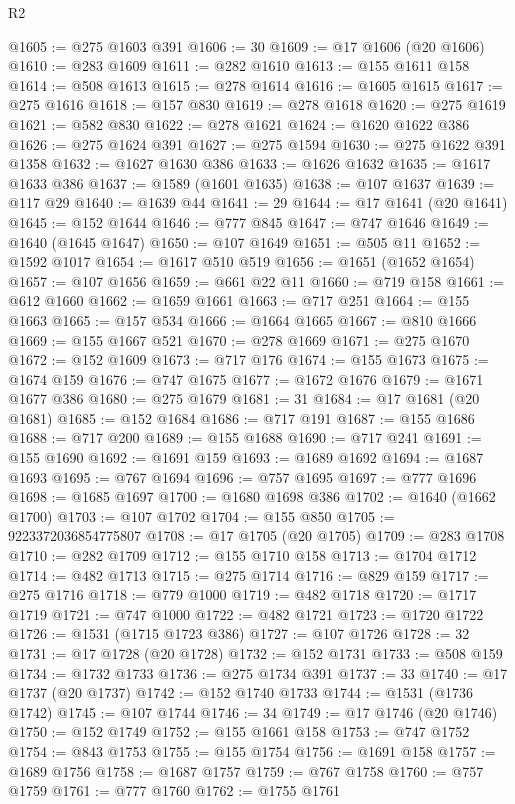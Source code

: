 \begin{lexlean}{R2}
\begin{coremodule}
@1605 := @275 @1603 @391
@1606 := 30
@1609 := @17 @1606 (@20 @1606)
@1610 := @283 @1609
@1611 := @282 @1610
@1613 := @155 @1611 @158
@1614 := @508 @1613
@1615 := @278 @1614
@1616 := @1605 @1615
@1617 := @275 @1616
@1618 := @157 @830
@1619 := @278 @1618
@1620 := @275 @1619
@1621 := @582 @830
@1622 := @278 @1621
@1624 := @1620 @1622 @386
@1626 := @275 @1624 @391
@1627 := @275 @1594
@1630 := @275 @1622 @391 @1358
@1632 := @1627 @1630 @386
@1633 := @1626 @1632
@1635 := @1617 @1633 @386
@1637 := @1589 (@1601 @1635)
@1638 := @107 @1637
@1639 := @117 @29
@1640 := @1639 @44
@1641 := 29
@1644 := @17 @1641 (@20 @1641)
@1645 := @152 @1644
@1646 := @777 @845
@1647 := @747 @1646
@1649 := @1640 (@1645 @1647)
@1650 := @107 @1649
@1651 := @505 @11
@1652 := @1592 @1017
@1654 := @1617 @510 @519
@1656 := @1651 (@1652 @1654)
@1657 := @107 @1656
@1659 := @661 @22 @11
@1660 := @719 @158
@1661 := @612 @1660
@1662 := @1659 @1661
@1663 := @717 @251
@1664 := @155 @1663
@1665 := @157 @534
@1666 := @1664 @1665
@1667 := @810 @1666
@1669 := @155 @1667 @521
@1670 := @278 @1669
@1671 := @275 @1670
@1672 := @152 @1609
@1673 := @717 @176
@1674 := @155 @1673
@1675 := @1674 @159
@1676 := @747 @1675
@1677 := @1672 @1676
@1679 := @1671 @1677 @386
@1680 := @275 @1679
@1681 := 31
@1684 := @17 @1681 (@20 @1681)
@1685 := @152 @1684
@1686 := @717 @191
@1687 := @155 @1686
@1688 := @717 @200
@1689 := @155 @1688
@1690 := @717 @241
@1691 := @155 @1690
@1692 := @1691 @159
@1693 := @1689 @1692
@1694 := @1687 @1693
@1695 := @767 @1694
@1696 := @757 @1695
@1697 := @777 @1696
@1698 := @1685 @1697
@1700 := @1680 @1698 @386
@1702 := @1640 (@1662 @1700)
@1703 := @107 @1702
@1704 := @155 @850
@1705 := 9223372036854775807
@1708 := @17 @1705 (@20 @1705)
@1709 := @283 @1708
@1710 := @282 @1709
@1712 := @155 @1710 @158
@1713 := @1704 @1712
@1714 := @482 @1713
@1715 := @275 @1714
@1716 := @829 @159
@1717 := @275 @1716
@1718 := @779 @1000
@1719 := @482 @1718
@1720 := @1717 @1719
@1721 := @747 @1000
@1722 := @482 @1721
@1723 := @1720 @1722
@1726 := @1531 (@1715 @1723 @386)
@1727 := @107 @1726
@1728 := 32
@1731 := @17 @1728 (@20 @1728)
@1732 := @152 @1731
@1733 := @508 @159
@1734 := @1732 @1733
@1736 := @275 @1734 @391
@1737 := 33
@1740 := @17 @1737 (@20 @1737)
@1742 := @152 @1740 @1733
@1744 := @1531 (@1736 @1742)
@1745 := @107 @1744
@1746 := 34
@1749 := @17 @1746 (@20 @1746)
@1750 := @152 @1749
@1752 := @155 @1661 @158
@1753 := @747 @1752
@1754 := @843 @1753
@1755 := @155 @1754
@1756 := @1691 @158
@1757 := @1689 @1756
@1758 := @1687 @1757
@1759 := @767 @1758
@1760 := @757 @1759
@1761 := @777 @1760
@1762 := @1755 @1761

\end{coremodule}
\end{lexlean}
